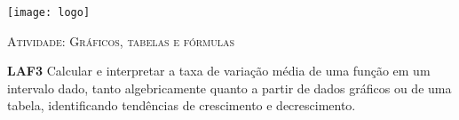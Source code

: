 \documentclass[10 pt,usenames,dvipsnames, oneside]{article}
\begin{document}
\begin{center}
  \begin{minipage}[l]{3cm}
\texttt{[image: logo]}    
\end{minipage}\hfill
\begin{minipage}[r]{.8\textwidth}
 {\Large \scshape Atividade: Gráficos, tabelas e fórmulas}  
\end{minipage}
\end{center}
\vspace{.2cm}

\ifdefined\prof
\begin{objetivos}
\item \textbf{LAF3} Calcular e interpretar a taxa de variação média de uma função em um intervalo dado, tanto algebricamente quanto a partir de dados gráficos ou de uma tabela, identificando tendências de crescimento e decrescimento.
\end{objetivos}
\end{document}
